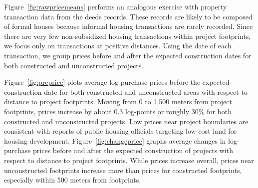 \documentclass[12pt]{article}
\begin{document}
Figure~\ref{fig:rawpricemeans} performs an analogous exercise with property transaction data from the deeds records.  These records are likely to be composed of formal houses because informal housing transactions are rarely recorded.  Since there are very few non-subsidized housing transactions within project footprints, we focus only on transactions at positive distances.  Using the date of each transaction, we group prices before and after the expected construction dates for both constructed and unconstructed projects. 

Figure~\ref{fig:preprice} plots average log purchase prices before the expected construction date for both constructed and unconstructed areas with respect to distance to project footprints.  Moving from 0 to 1,500 meters from project footprints, prices increase by about 0.3 log-points or roughly 30\% for both constructed and unconstructed projects.  Low prices near project boundaries are consistent with reports of public housing officials targeting low-cost land for housing development.  Figure~\ref{fig:changeprice} graphs average changes in log-purchase prices before and after the expected construction of projects with respect to distance to project footprints.  While prices increase overall, prices near unconstructed footprints increase more than prices for constructed footprints, especially within 500 meters from footprints.  
\end{document}
